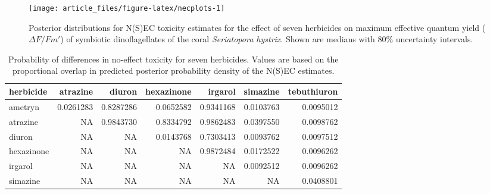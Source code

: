 \documentclass[
  shortnames]{jss}
\begin{document}
\begin{CodeChunk}
\end{CodeChunk}

\begin{CodeChunk}
\begin{figure}[!ht]

{\centering \texttt{[image: article\_files/figure-latex/necplots-1]} 

}

\caption[Posterior distributions for N(S)EC toxicity estimates for the effect of seven herbicides on maximum effective quantum yield ($\Delta F / Fm'$) of symbiotic dinoflagellates of the coral \textit{Seriatopora hystrix}]{Posterior distributions for N(S)EC toxicity estimates for the effect of seven herbicides on maximum effective quantum yield ($\Delta F / Fm'$) of symbiotic dinoflagellates of the coral \textit{Seriatopora hystrix}. Shown are medians with 80\%  uncertainty intervals.}\label{fig:necplots}
\end{figure}
\end{CodeChunk}

\begin{CodeChunk}
\begin{table}

\caption{\label{tab:probdiffs}Probability of differences in no-effect toxicity for seven herbicides. Values are based on the proportional overlap in predicted posterior probability density of the N(S)EC estimates.}
\centering
\begin{tabular}[t]{l|r|r|r|r|r|r}
\hline
herbicide & atrazine & diuron & hexazinone & irgarol & simazine & tebuthiuron\\
\hline
ametryn & 0.0261283 & 0.8287286 & 0.0652582 & 0.9341168 & 0.0103763 & 0.0095012\\
\hline
atrazine & NA & 0.9843730 & 0.8334792 & 0.9862483 & 0.0397550 & 0.0098762\\
\hline
diuron & NA & NA & 0.0143768 & 0.7303413 & 0.0093762 & 0.0097512\\
\hline
hexazinone & NA & NA & NA & 0.9872484 & 0.0172522 & 0.0096262\\
\hline
irgarol & NA & NA & NA & NA & 0.0092512 & 0.0096262\\
\hline
simazine & NA & NA & NA & NA & NA & 0.0408801\\
\hline
\end{tabular}
\end{table}

\end{CodeChunk}
\end{document}
